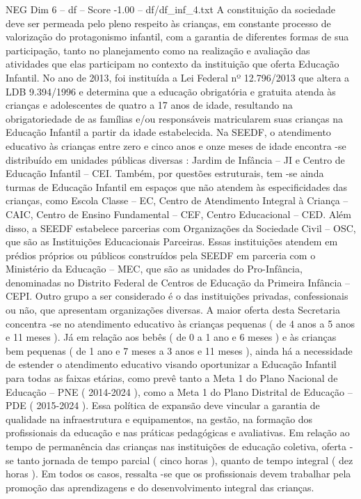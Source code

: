 \begin{textsample}{NEG Dim 6 – df – Score -1.00 – df/df\_inf\_4.txt}
A constituição da sociedade deve ser permeada pelo pleno respeito às crianças, em constante processo de valorização do protagonismo infantil, com a garantia de diferentes formas de sua participação, tanto no planejamento como na realização e avaliação das atividades que elas participam no contexto da instituição que oferta Educação Infantil.
No ano de 2013, foi instituída a Lei Federal nº 12.796/2013 que altera a LDB 9.394/1996 e determina que a educação obrigatória e gratuita atenda às crianças e adolescentes de quatro a 17 anos de idade, resultando na obrigatoriedade de as famílias e/ou responsáveis matricularem suas crianças na Educação Infantil a partir da idade estabelecida.
Na SEEDF, o atendimento educativo às crianças entre zero e cinco anos e onze meses de idade encontra -se distribuído em unidades públicas diversas : Jardim de Infância – JI e Centro de Educação Infantil – CEI.
Também, por questões estruturais, tem -se ainda turmas de Educação Infantil em espaços que não atendem às especificidades das crianças, como Escola Classe – EC, Centro de Atendimento Integral à Criança – CAIC, Centro de Ensino Fundamental – CEF, Centro Educacional – CED.
Além disso, a SEEDF estabelece parcerias com Organizações da Sociedade Civil – OSC, que são as Instituições Educacionais Parceiras.
Essas instituições atendem em prédios próprios ou públicos construídos pela SEEDF em parceria com o Ministério da Educação – MEC, que são as unidades do Pro-Infância, denominadas no Distrito Federal de Centros de Educação da Primeira Infância – CEPI.
Outro grupo a ser considerado é o das instituições privadas, confessionais ou não, que apresentam organizações diversas.
A maior oferta desta Secretaria concentra -se no atendimento educativo às crianças pequenas ( de 4 anos a 5 anos e 11 meses ).
Já em relação aos bebês ( de 0 a 1 ano e 6 meses ) e às crianças bem pequenas ( de 1 ano e 7 meses a 3 anos e 11 meses ), ainda há a necessidade de estender o atendimento educativo visando oportunizar a Educação Infantil para todas as faixas etárias, como prevê tanto a Meta 1 do Plano Nacional de Educação – PNE ( 2014-2024 ), como a Meta 1 do Plano Distrital de Educação – PDE ( 2015-2024 ).
Essa política de expansão deve vincular a garantia de qualidade na infraestrutura e equipamentos, na gestão, na formação dos profissionais da educação e nas práticas pedagógicas e avaliativas.
Em relação ao tempo de permanência das crianças nas instituições de educação coletiva, oferta -se tanto jornada de tempo parcial ( cinco horas ), quanto de tempo integral ( dez horas ).
Em todos os casos, ressalta -se que os profissionais devem trabalhar pela promoção das aprendizagens e do desenvolvimento integral das crianças.

\end{textsample}

